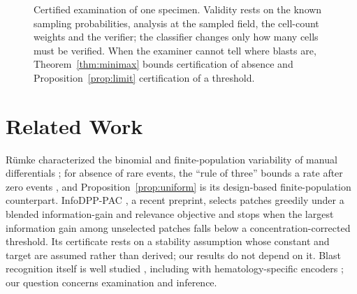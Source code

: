 \documentclass[journal]{IEEEtran}
\begin{document}
\begin{figure}[t]
\centering
{}
\caption{Certified examination of one specimen. Validity rests on the known sampling probabilities, analysis at the sampled field, the cell-count weights and the verifier; the classifier changes only how many cells must be verified. When the examiner cannot tell where blasts are, Theorem~\ref{thm:minimax} bounds certification of absence and Proposition~\ref{prop:limit} certification of a threshold.}\label{fig:pipeline}
\end{figure}

\section{Related Work}
R\"umke characterized the binomial and finite-population variability of manual differentials \cite{rumke1978}; for absence of rare events, the ``rule of three'' bounds a rate after zero events \cite{hanley1983}, and Proposition~\ref{prop:uniform} is its design-based finite-population counterpart. InfoDPP-PAC \cite{mittal2026infodpp}, a recent preprint, selects patches greedily under a blended information-gain and relevance objective and stops when the largest information gain among unselected patches falls below a concentration-corrected threshold. Its certificate rests on a stability assumption whose constant and target are assumed rather than derived; our results do not depend on it. Blast recognition itself is well studied \cite{matek2019aml}, including with hematology-specific encoders \cite{koch2024dinobloom}; our question concerns examination and inference.
\end{document}
